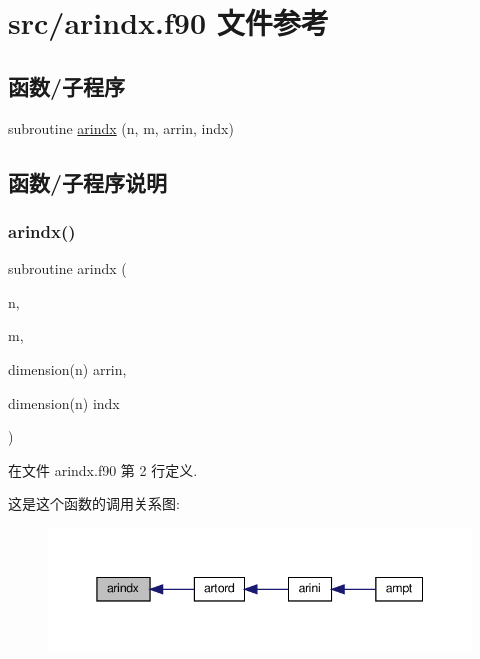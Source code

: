 \hypertarget{arindx_8f90}{}\section{src/arindx.f90 文件参考}
\label{arindx_8f90}
\subsection*{函数/子程序}
\begin{DoxyCompactItemize}
\item 
subroutine \mbox{\hyperlink{arindx_8f90_a1d28384ed4aad9763d2e108a84b3424d}{arindx}} (n, m, arrin, indx)
\end{DoxyCompactItemize}


\subsection{函数/子程序说明}
\mbox{\label{arindx_8f90_a1d28384ed4aad9763d2e108a84b3424d}} 
\subsubsection{\texorpdfstring{arindx()}{arindx()}}
{\footnotesize\ttfamily subroutine arindx (\begin{DoxyParamCaption}\item[{}]{n,  }\item[{}]{m,  }\item[{dimension(n)}]{arrin,  }\item[{dimension(n)}]{indx }\end{DoxyParamCaption})}



在文件 arindx.\+f90 第 2 行定义.

这是这个函数的调用关系图\+:
\nopagebreak
\begin{figure}[H]
\begin{center}
\leavevmode
\includegraphics[width=345pt]{arindx_8f90_a1d28384ed4aad9763d2e108a84b3424d_icgraph}
\end{center}
\end{figure}
